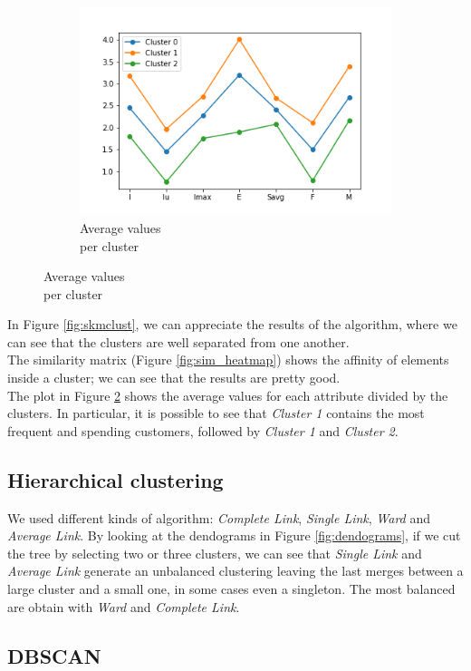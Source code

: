 \begin{figure}[h!]
\begin{subfigure}{0.32\textwidth}
        \includegraphics[width=\textwidth]{img/clustering/cluster_avg.png}
	\caption{Average values\\ per cluster}
        \label{fig:km_avg}
    \end{subfigure}
\end{figure}

In Figure \ref{fig:skmclust}, we can appreciate the results of the algorithm, where we can see that the clusters are well separated from one another.\\
The similarity matrix (Figure \ref{fig:sim_heatmap}) shows the affinity of elements inside a cluster; we can see that the results are pretty good.\\
The plot in Figure \ref{fig:km_avg} shows the average values for each attribute divided by the clusters. In particular, it is possible to see that \emph{Cluster 1} contains the most frequent and spending customers, followed by \emph{Cluster 1} and \emph{Cluster 2}.

\subsection{Hierarchical clustering}
We used different kinds of algorithm: \emph{Complete Link}, \emph{Single Link}, \emph{Ward} and \emph{Average Link}. By looking at the dendograms in Figure \ref{fig:dendograms}, if we cut the tree by selecting two or three clusters, we can see that \emph{Single Link} and \emph{Average Link} generate an unbalanced clustering leaving the last merges between a large cluster and a small one, in some cases even a singleton. The most balanced are obtain with \emph{Ward} and \emph{Complete Link}.

\subsection{DBSCAN}

